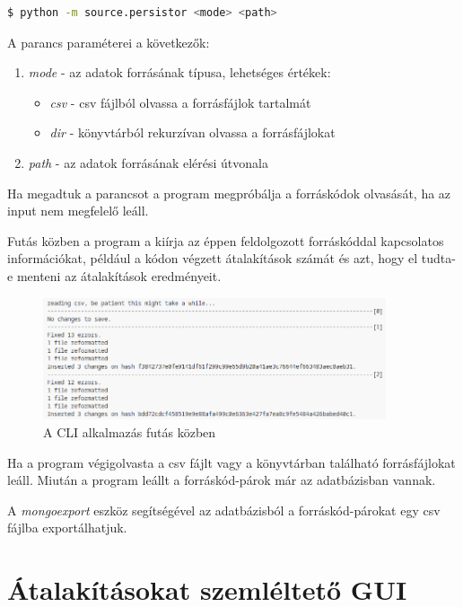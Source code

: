 \begin{lstlisting}[language=bash, numbers=none]
	$ python -m source.persistor <mode> <path>
\end{lstlisting}

A parancs paraméterei a következők:

\begin{enumerate}
	\item\label{step:first} \emph{mode} - az adatok forrásának típusa,
	lehetséges értékek:
	\begin{itemize}
		\item \emph{csv} - csv fájlból olvassa a forrásfájlok tartalmát
		\item \emph{dir} - könyvtárból rekurzívan olvassa a forrásfájlokat
	\end{itemize}
	\item \emph{path} - az adatok forrásának elérési útvonala
\end{enumerate}

Ha megadtuk a parancsot a program megpróbálja a forráskódok olvasását,
ha az input nem megfelelő leáll.

Futás közben a program a kiírja az éppen feldolgozott forráskóddal kapcsolatos információkat,
például a kódon végzett átalakítások számát és azt, hogy el tudta-e menteni az átalakítások eredményeit.

\begin{figure}[H]
	\centering
	\includegraphics[width=0.9\textwidth,frame]{images/screenshots/log.png}
	\caption{A CLI alkalmazás futás közben}
\end{figure}

Ha a program végigolvasta a csv fájlt vagy a könyvtárban található forrásfájlokat leáll.
Miután a program leállt a forráskód-párok már az adatbázisban vannak.

A \emph{mongoexport} eszköz segítségével
az adatbázisból a forráskód-párokat egy csv fájlba exportálhatjuk.

\section{Átalakításokat szemléltető GUI}

